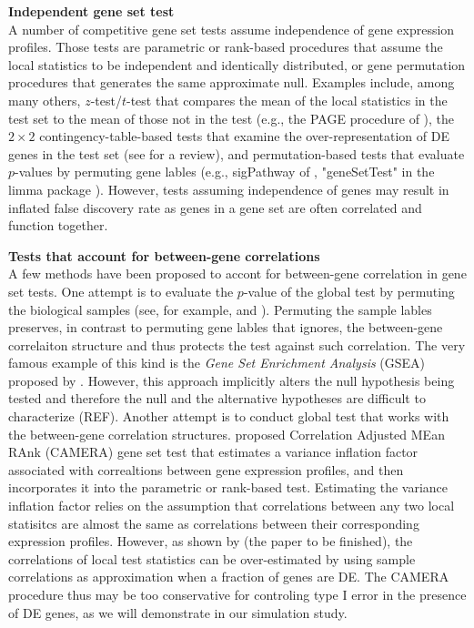 \documentclass[11pt, a4paper]{article}
\begin{document}
	\textbf{Independent gene set test} \\
	 A number of competitive gene set tests assume independence of gene expression profiles. Those tests are parametric or rank-based procedures that assume the local statistics to be independent and identically distributed, or gene permutation procedures that generates the same approximate null. Examples include, among many others, $z$-test/$t$-test that compares the mean of the local statistics in the test set to the mean of those not in the test (e.g., the PAGE procedure of \citealp{kim2005page}), the $2\times 2$ contingency-table-based tests that examine the over-representation of DE genes in the test set (see \citealp{huang2009bioinformatics} for a review), and permutation-based tests that evaluate $p$-values by permuting gene lables (e.g., sigPathway of \citealp{tian2005discovering}, "geneSetTest" in the limma package \citealp{Smyth2004moderated}). However, tests assuming independence of genes may result in inflated false discovery rate \citep{efron2007testing}
	 as genes in a gene set are often correlated and function together.
	 
	  \textbf{Tests that account for between-gene correlations}\\

	  A few methods have been proposed to accont for between-gene correlation in gene set tests. One attempt is to evaluate the $p$-value of the global test by permuting the biological samples (see, for example, \citealp{subramanian2005gene} and \citealp{efron2007testing}). Permuting the sample lables preserves, in contrast to permuting gene lables that ignores, the between-gene correlaiton structure and thus protects the test against such correlation. The very famous example of this kind is the \textit{Gene Set Enrichment Analysis }(GSEA) proposed by \cite{subramanian2005gene}.  However, this approach implicitly alters the null hypothesis being tested and therefore the null and the alternative hypotheses are difficult to characterize (REF). Another attempt is to conduct global test that works with the between-gene correlation structures. \cite{wu2012camera} proposed Correlation Adjusted MEan RAnk (CAMERA) gene set test that estimates a variance inflation factor associated with correaltions between gene expression profiles, and then incorporates it into the parametric or rank-based test. Estimating the variance inflation factor relies on the assumption that correlations between any two local statisitcs are almost the same as correlations between their corresponding expression profiles. However, as shown by (the paper to be finished), the correlations of local test statistics can be over-estimated by using sample correlations as approximation when a fraction of genes are DE. The CAMERA procedure thus may be too conservative for controling type I error in the presence of DE genes, as we will demonstrate in our simulation study. 
\end{document}
